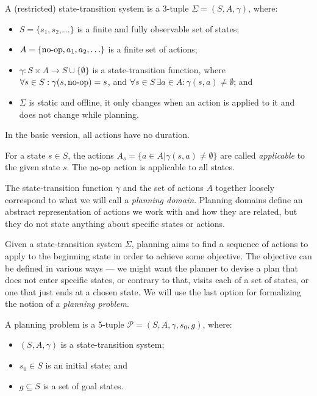 \begin{defn}\label{defn:state-transition-sys}
A (restricted) state-transition system is a 3-tuple $\Sigma = (S, A, \gamma)$, where:
\begin{itemize}
\item $S = \{s_1, s_2, \ldots\}$ is a finite and fully observable set of states;
\item $A = \{\operatorname{\textrm{no-op}}, a_1, a_2, \ldots\}$ is a finite set of actions;
\item $\gamma: S \times A \to S \cup \{\emptyset\}$ is a state-transition function,
where $\forall s \in S : \gamma(s, \operatorname{\textrm{no-op}}) = s$,
and $\forall s \in S\,\exists a \in A : \gamma(s, a) \neq \emptyset$; and
\item $\Sigma$ is static and offline,
it only changes when an action is applied to it and does not change while planning.
\end{itemize}
In the basic version, all actions have no duration.
\end{defn}

For a state $s \in S$, the actions $A_s = \{a \in A | \gamma(s, a) \neq \emptyset\}$ are called \textit{applicable}
to the given state $s$. The $\operatorname{\textrm{no-op}}$ action is applicable to all states.

The state-transition function $\gamma$ and the set of actions $A$ together loosely correspond to what we will call a \textit{planning domain}.
Planning domains define an abstract representation of actions we work with
and how they are related,
but they do not state anything about specific states or actions.

Given a state-transition system $\Sigma$, planning aims to find a
sequence of actions to apply to the beginning state in order to achieve some objective.
The objective can be defined in various ways --- we might want the planner
to devise a plan that
does not enter specific states, or contrary to that, visits each of a set of states,
or one that just ends at a chosen state.
We will use the last option for formalizing the notion of a \textit{planning problem}.

\begin{defn}\label{defn:planning-problem}\citep[Part~I]{Ghallab2004}
A planning problem is a 5-tuple $\mathcal{P} = (S, A, \gamma, s_0, g)$, where:
\begin{itemize}
\item $(S, A, \gamma)$ is a state-transition system;
\item $s_0 \in S$ is an initial state; and
\item $g \subseteq S$ is a set of goal states.
\end{itemize}
\end{defn}

